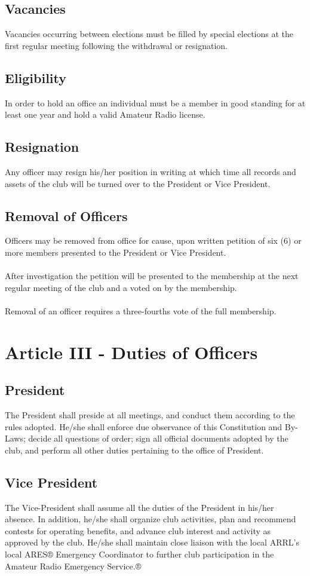 \documentclass[english,12pt,letterpaper]{article}
\begin{document}
	\subsection{Vacancies}
	Vacancies occurring between elections must be filled by special elections at the first regular meeting following the withdrawal or resignation.
	\subsection{Eligibility}
	In order to hold an office an individual must be a member in good standing for at least one year and hold a valid Amateur Radio license.
	\subsection{Resignation}
	Any officer may resign his/her position in writing at which time all records and assets of the club will be turned over to the President or Vice President.
	\subsection{Removal of Officers}
	Officers may be removed from office for cause, upon written petition of six (6) or more members presented to the President or Vice President. \\
	\\
	After investigation the petition will be presented to the membership at the next regular meeting of the club and a voted on by the membership. \\
	\\
	Removal of an officer requires a three-fourths vote of the full membership.
	\section{Article III - Duties of Officers}
	\subsection{President}
	The President shall preside at all meetings, and conduct them according to the rules adopted. He/she shall enforce due observance of this Constitution and By-Laws; decide all questions of order; sign all official documents adopted by the club, and perform all other duties pertaining to the office of President.
	\subsection{Vice President}
	The Vice-President shall assume all the duties of the President in his/her absence. In addition, he/she shall organize club activities, plan and recommend contests for operating benefits, and advance club interest and activity as approved by the club. He/she shall maintain close liaison with the local ARRL's local ARES® Emergency Coordinator to further club participation in the Amateur Radio Emergency Service.®
\end{document}
